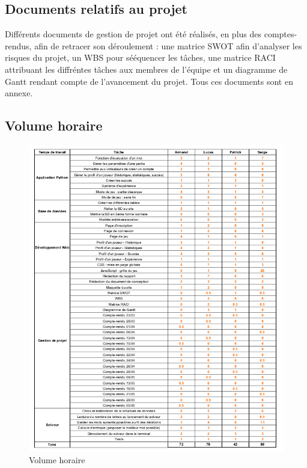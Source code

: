 \subsection{Documents relatifs au projet}

\tabto{1cm}Différents documents de gestion de projet ont été réalisés, en plus des comptes-rendus, afin de retracer son déroulement : une matrice SWOT afin d'analyser les risques du projet, un WBS pour sééquencer les tâches, une matrice RACI attribuant les diffréntes tâches aux membres de l'équipe et un diagramme de Gantt rendant compte de l'avancement du projet. Tous ces documents sont en annexe.

\newpage
\subsection{Volume horaire}
\begin{figure}[h!]
    \centering
    \includegraphics[width=16cm]{figures/Temps_travail.png}
    \caption{Volume horaire}
\end{figure}